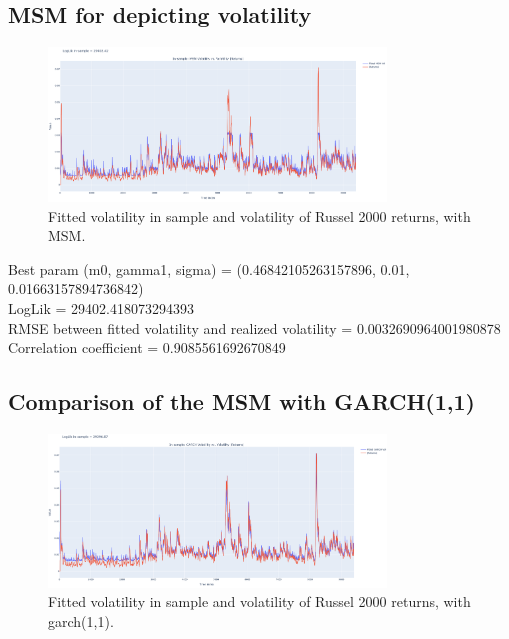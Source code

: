 \documentclass[11pt]{extarticle}
\begin{document}
\subsection{MSM for depicting volatility}

\begin{figure}[!ht]
    \centering
    \includegraphics[width=0.8\textwidth]{img/msm_vol}
    \caption{Fitted volatility in sample and volatility of Russel 2000 returns, with MSM.}
    \label{fig:msm_fitted_vol}
\end{figure}

\FloatBarrier

Best param (m0, gamma1, sigma) = (0.46842105263157896, 0.01, 0.01663157894736842) \\

LogLik = 29402.418073294393 \\

RMSE between fitted volatility and realized volatility = 0.0032690964001980878 \\

Correlation coefficient = 0.9085561692670849 \\



\subsection{Comparison of the MSM with GARCH(1,1)}

\begin{figure}[!ht]
    \centering
    \includegraphics[width=0.8\textwidth]{img/garch_vol}
    \caption{Fitted volatility in sample and volatility of Russel 2000 returns, with garch(1,1).}
    \label{fig:garch_fitted_vol}
\end{figure}
\end{document}
